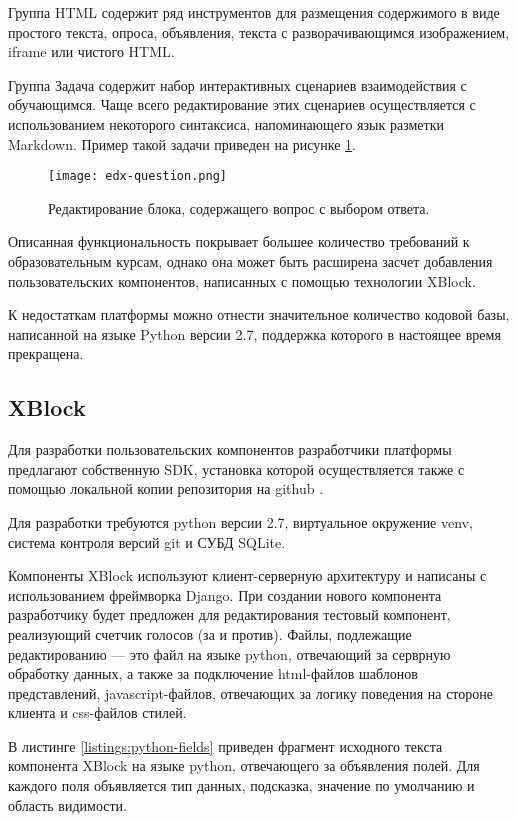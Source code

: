 Группа HTML содержит ряд инструментов для размещения содержимого в виде простого текста, опроса, объявления, текста с разворачивающимся изображением, iframe или чистого HTML. 

Группа Задача содержит набор интерактивных сценариев взаимодействия с обучающимся. Чаще всего редактирование этих сценариев осуществляется с использованием некоторого синтаксиса, напоминающего язык разметки Markdown. Пример такой задачи приведен на рисунке \ref{fig:edx-question}.


\begin{figure}[htbp]
	\centering
	\texttt{[image: edx-question.png]}
	\caption{Редактирование блока, содержащего вопрос с выбором ответа.}%
	\label{fig:edx-question}
\end{figure}

Описанная функциональность покрывает большее количество требований к образовательным курсам, однако она может быть расширена засчет добавления пользовательских компонентов, написанных с помощью технологии XBlock.

К недостаткам платформы можно отнести значительное количество кодовой базы, написанной на языке Python версии 2.7, поддержка которого в настоящее время прекращена.

\subsection{XBlock}

Для разработки пользовательских компонентов разработчики платформы предлагают собственную SDK, установка которой осуществляется также с помощью локальной копии репозитория на github \cite{sdk-github}.

Для разработки требуются python версии 2.7, виртуальное окружение venv, система
контроля версий git и СУБД SQLite.

Компоненты XBlock используют клиент-серверную архитектуру и написаны с использованием фреймворка Django. При создании нового компонента разработчику будет предложен для редактирования тестовый компонент, реализующий счетчик голосов (за и против). Файлы, подлежащие редактированию — это файл на языке python, отвечающий за серврную обработку данных, а также за подключение html-файлов шаблонов представлений, javascript-файлов, отвечающих за логику поведения на стороне клиента и css-файлов стилей.

В листинге \ref{listings:python-fields} приведен фрагмент исходного текста компонента XBlock на языке python, отвечающего за объявления полей. Для каждого поля объявляется тип данных, подсказка, значение по умолчанию и область видимости.


